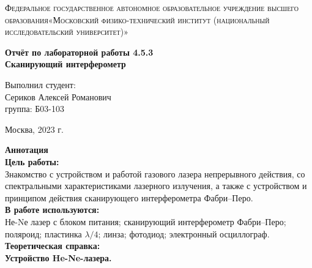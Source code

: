 \documentclass[a4paper, 12pt]{article}%
\begin{document}
	\begin{titlepage}
		\begin{center}
			\textsc{Федеральное государственное автономное образовательное учреждение высшего образования«Московский физико-технический институт (национальный исследовательский университет)»\\[5mm]
			}
			
			\vfill
			
			\textbf{Отчёт по лабораторной работы 4.5.3 \\[3mm]
				Сканирующий интерферометр 
				\\[50mm]
			}
			
		\end{center}
		
		\hfill
		\begin{minipage}{.5\textwidth}
			Выполнил студент:\\[2mm]
			Сериков Алексей Романович\\[2mm]
			группа: Б03-103\\[5mm]
			
		\end{minipage}
		\vfill
		\begin{center}
			Москва, 2023 г.
		\end{center}
		
	\end{titlepage}
	
	\newpage
	\textbf{Аннотация}\\
	
	
	\textbf{Цель работы: }\\
	
	Знакомство с устройством и работой газового лазера
	непрерывного действия, со спектральными характеристиками лазерного излучения, а также с устройством и принципом действия сканирующего интерферометра Фабри–Перо.\\
	
	\textbf{В работе используются: }\\
	
	Не-Nе лазер с блоком питания; сканирующий интерферометр Фабри–Перо; поляроид; пластинка $\lambda / 4$; линза;
	фотодиод; электронный осциллограф.\\
	
	\textbf{Теоретическая справка:}\\
	
	
	
	\noindent \textbf{Устройство He-Ne-лазера.}\\
	
\end{document}
